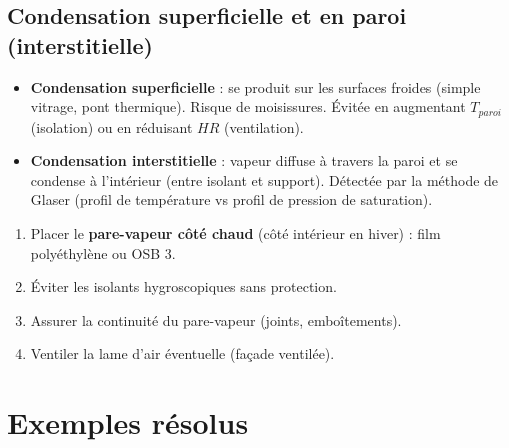 \subsection{Condensation superficielle et en paroi (interstitielle)}

\begin{itemize}
  \item \textbf{Condensation superficielle} : se produit sur les surfaces froides (simple vitrage, pont thermique). Risque de moisissures. Évitée en augmentant $T_{paroi}$ (isolation) ou en réduisant $HR$ (ventilation).
  \item \textbf{Condensation interstitielle} : vapeur diffuse à travers la paroi et se condense à l'intérieur (entre isolant et support). Détectée par la méthode de Glaser (profil de température vs profil de pression de saturation).
\end{itemize}

\begin{methode}[title=Prévention de la condensation interstitielle]
  \begin{enumerate}
    \item Placer le \textbf{pare-vapeur côté chaud} (côté intérieur en hiver) : film polyéthylène ou OSB 3.
    \item Éviter les isolants hygroscopiques sans protection.
    \item Assurer la continuité du pare-vapeur (joints, emboîtements).
    \item Ventiler la lame d'air éventuelle (façade ventilée).
  \end{enumerate}
\end{methode}

\section{Exemples résolus}

